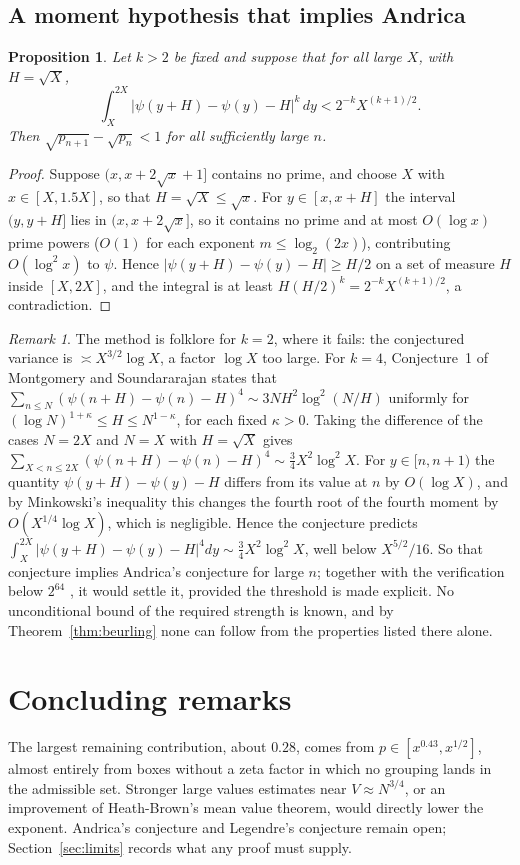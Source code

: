 \documentclass[11pt]{amsart}
\newtheorem{proposition}[theorem]{Proposition}
\theoremstyle{definition}
\theoremstyle{remark}
\newtheorem{remark}[theorem]{Remark}
\begin{document}
\subsection{A moment hypothesis that implies Andrica}

\begin{proposition}\label{prop:moment}
Let $k>2$ be fixed and suppose that for all large $X$, with $H=\sqrt X$,
\[
\int_X^{2X}\big|\psi(y+H)-\psi(y)-H\big|^k\,dy<2^{-k}X^{(k+1)/2}.
\]
Then $\sqrt{p_{n+1}}-\sqrt{p_n}<1$ for all sufficiently large $n$.
\end{proposition}

\begin{proof}
Suppose $(x,x+2\sqrt x+1]$ contains no prime, and choose $X$ with $x\in[X,1.5X]$, so that $H=\sqrt X\le\sqrt x$. For $y\in[x,x+H]$ the interval $(y,y+H]$ lies in $(x,x+2\sqrt x]$, so it contains no prime and at most $O(\log x)$ prime powers ($O(1)$ for each exponent $m\le\log_2(2x)$), contributing $O(\log^2 x)$ to $\psi$. Hence $|\psi(y+H)-\psi(y)-H|\ge H/2$ on a set of measure $H$ inside $[X,2X]$, and the integral is at least $H(H/2)^k=2^{-k}X^{(k+1)/2}$, a contradiction.
\end{proof}

\begin{remark}
The method is folklore for $k=2$, where it fails: the conjectured variance is $\asymp X^{3/2}\log X$, a factor $\log X$ too large. For $k=4$, Conjecture~1 of Montgomery and Soundararajan \cite{MS} states that $\sum_{n\le N}(\psi(n+H)-\psi(n)-H)^4\sim 3NH^2\log^2(N/H)$ uniformly for $(\log N)^{1+\kappa}\le H\le N^{1-\kappa}$, for each fixed $\kappa>0$. Taking the difference of the cases $N=2X$ and $N=X$ with $H=\sqrt X$ gives $\sum_{X<n\le 2X}(\psi(n+H)-\psi(n)-H)^4\sim\frac34X^2\log^2X$. For $y\in[n,n+1)$ the quantity $\psi(y+H)-\psi(y)-H$ differs from its value at $n$ by $O(\log X)$, and by Minkowski's inequality this changes the fourth root of the fourth moment by $O(X^{1/4}\log X)$, which is negligible. Hence the conjecture predicts $\int_X^{2X}|\psi(y+H)-\psi(y)-H|^4dy\sim\frac34X^2\log^2X$, well below $X^{5/2}/16$. So that conjecture implies Andrica's conjecture for large $n$; together with the verification below $2^{64}$ \cite{Visser}, it would settle it, provided the threshold is made explicit. No unconditional bound of the required strength is known, and by Theorem~\ref{thm:beurling} none can follow from the properties listed there alone.
\end{remark}

\section{Concluding remarks}
The largest remaining contribution, about $0.28$, comes from $p\in[x^{0.43},x^{1/2}]$, almost entirely from boxes without a zeta factor in which no grouping lands in the admissible set. Stronger large values estimates near $V\approx N^{3/4}$, or an improvement of Heath-Brown's mean value theorem, would directly lower the exponent. Andrica's conjecture and Legendre's conjecture remain open; Section~\ref{sec:limits} records what any proof must supply.
\end{document}
